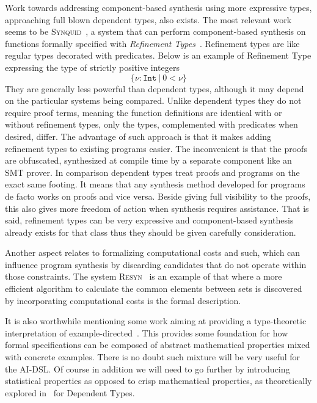 \documentclass[]{report}
\begin{document}
Work towards addressing component-based synthesis using more
expressive types, approaching full blown dependent types, also exists.
The most relevant work seems to be
\textsc{Synquid}~\cite{Polikarpova2016}, a system that can perform
component-based synthesis on functions formally specified with
\emph{Refinement Types}~\cite{Flanagan2006}.  Refinement types are
like regular types decorated with predicates.  Below is an example of
Refinement Type expressing the type of strictly positive integers
$$\{\nu : \texttt{Int}\ |\ 0 < \nu\}$$
They are generally less powerful than dependent types, although it may
depend on the particular systems being compared.  Unlike dependent
types they do not require proof terms, meaning the function
definitions are identical with or without refinement types, only the
types, complemented with predicates when desired, differ.  The
advantage of such approach is that it makes adding refinement types to
existing programs easier.  The inconvenient is that the proofs are
obfuscated, synthesized at compile time by a separate component like
an SMT prover.  In comparison dependent types treat proofs and
programs on the exact same footing.  It means that any synthesis
method developed for programs de facto works on proofs and vice versa.
Beside giving full visibility to the proofs, this also gives more
freedom of action when synthesis requires assistance.  That is said,
refinement types can be very expressive and component-based synthesis
already exists for that class thus they should be given carefully
consideration.

Another aspect relates to formalizing computational costs and such,
which can influence program synthesis by discarding candidates that do
not operate within those constraints.  The system
\textsc{Resyn}~\cite{Knoth2019} is an example of that where a more
efficient algorithm to calculate the common elements between sets is
discovered by incorporating computational costs is the formal
description.

It is also worthwhile mentioning some work aiming at providing a
type-theoretic interpretation of example-directed~\cite{Frankle2016}.
This provides some foundation for how formal specifications can be
composed of abstract mathematical properties mixed with concrete
examples.  There is no doubt such mixture will be very useful for the
AI-DSL.  Of course in addition we will need to go further by
introducing statistical properties as opposed to crisp mathematical
properties, as theoretically explored in~\cite{Warrell2016} for
Dependent Types.
\end{document}
